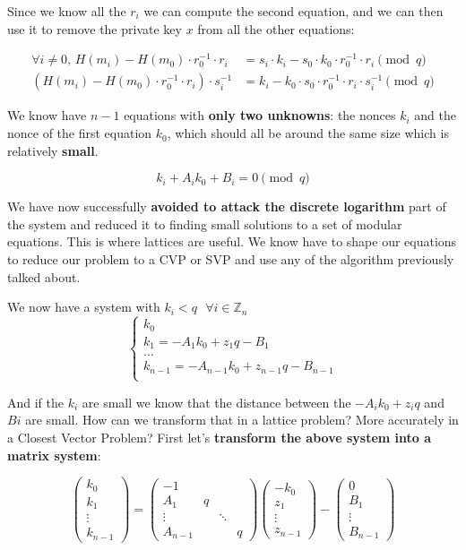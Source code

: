 \documentclass[a4paper,11pt]{article}
\begin{document}
Since we know all the $r_i$ we can compute the second equation, and we can then use it to remove the private key $x$ from all the other equations:

\begin{align*}
\forall i \neq 0 \text{, } H(m_i) - H(m_0) \cdot r_0^{-1} \cdot r_i &= s_i \cdot k_i - s_0 \cdot k_0 \cdot r_0^{-1} \cdot r_i \pmod{q}\\
(H(m_i) - H(m_0) \cdot r_0^{-1} \cdot r_i) \cdot s_i^{-1} &= k_i - k_0 \cdot s_0 \cdot r_0^{-1} \cdot r_i \cdot s_i^{-1} \pmod{q}
\end{align*}

We know have $n - 1$ equations with \textbf{only two unknowns}: the nonces $k_i$ and the nonce of the first equation $k_0$, which should all be around the same size which is relatively \textbf{small}.

$$ k_i + A_i k_0 + B_i = 0 \pmod{q} $$

We have now successfully \textbf{avoided to attack the discrete logarithm} part of the system and reduced it to finding small solutions to a set of modular equations. This is where lattices are useful. We know have to shape our equations to reduce our problem to a CVP or SVP and use any of the algorithm previously talked about.

We now have a system with $k_i < q \text{ } \forall i \in \mathbb{Z}_n$
$$ \begin{cases}
k_0\\
k_1 = - A_1 k_0 + z_1 q - B_1 \\
\hdots\\
k_{n-1} = - A_{n-1} k_0 + z_{n-1} q - B_{n-1}\\
\end{cases}
$$

And if the $k_i$ are small we know that the distance between the $-A_i k_0 + z_i q$ and $Bi$ are small. How can we transform that in a lattice problem? More accurately in a Closest Vector Problem? First let's \textbf{transform the above system into a matrix system}:

$$
\begin{pmatrix} k_0\\k_1\\ \vdots\\k_{n-1} \end{pmatrix} 
=
\begin{pmatrix}
-1\\
A_1 & q  \\
\vdots & & \ddots \\
A_{n-1} & & & q
\end{pmatrix}
\begin{pmatrix} -k_0\\z_1\\ \vdots\\z_{n-1} \end{pmatrix}
- 
\begin{pmatrix} 0\\B_1\\ \vdots\\B_{n-1} \end{pmatrix}
$$
\end{document}
